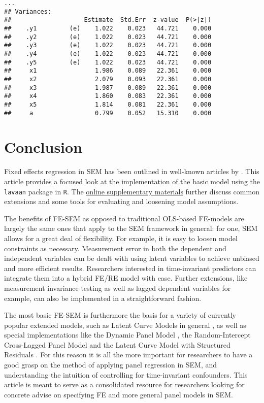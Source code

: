 \documentclass[]{interact}
\theoremstyle{plain}%
\theoremstyle{definition}
\theoremstyle{remark}
\begin{document}
\singlespacing

\begin{verbatim}
...
## Variances:
##                    Estimate  Std.Err  z-value  P(>|z|)
##    .y1         (e)    1.022    0.023   44.721    0.000
##    .y2         (e)    1.022    0.023   44.721    0.000
##    .y3         (e)    1.022    0.023   44.721    0.000
##    .y4         (e)    1.022    0.023   44.721    0.000
##    .y5         (e)    1.022    0.023   44.721    0.000
##     x1                1.986    0.089   22.361    0.000
##     x2                2.079    0.093   22.361    0.000
##     x3                1.987    0.089   22.361    0.000
##     x4                1.860    0.083   22.361    0.000
##     x5                1.814    0.081   22.361    0.000
##     a                 0.799    0.052   15.310    0.000
\end{verbatim}

\doublespacing

\hypertarget{conclusion}{%
\section{Conclusion}\label{conclusion}}

Fixed effects regression in SEM has been outlined in well-known articles
by \citep{Allison2011, Bollen2010, Teachman2001}. This article provides
a focused look at the implementation of the basic model using the
\texttt{lavaan} package in \texttt{R}. The
\href{https://github.com/henrik-andersen/FE-SEM/blob/master/extensions.pdf}{online
supplementary materials} further discuss common extensions and some
tools for evaluating and loosening model assumptions.

The benefits of FE-SEM as opposed to traditional OLS-based FE-models are
largely the same ones that apply to the SEM framework in general: for
one, SEM allows for a great deal of flexibility. For example, it is easy
to loosen model constraints as necessary. Measurement error in both the
dependent and independent variables can be dealt with using latent
variables to achieve unbiased and more efficient results. Researchers
interested in time-invariant predictors can integrate them into a hybrid
FE/RE model with ease. Further extensions, like measurement invariance
testing \citep{Schoot2012, Millsap2011, Steenkamp1998} as well as lagged
dependent variables \citep{Bollen2010, Allison2017} for example, can
also be implemented in a straightforward fashion.

The most basic FE-SEM is furthermore the basis for a variety of
currently popular extended models, such as Latent Curve Models in
general \citep{Curran2001, Bollen2004}, as well as special
implementations like the Dynamic Panel Model \citep{Allison2017}, the
Random-Intercept Cross-Lagged Panel Model \citep{Hamaker2015} and the
Latent Curve Model with Structured Residuals \citep{Curran2014}. For
this reason it is all the more important for researchers to have a good
grasp on the method of applying panel regression in SEM, and
understanding the intuition of controlling for time-invariant
confounders. This article is meant to serve as a consolidated resource
for researchers looking for concrete advise on specifying FE and more
general panel models in SEM.



\end{document}

